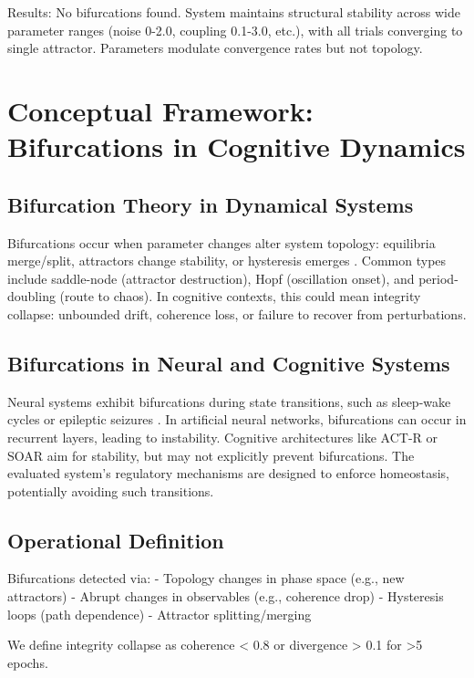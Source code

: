 \documentclass[11pt,a4paper]{article}
\begin{document}
Results: No bifurcations found. System maintains structural stability across wide parameter ranges (noise 0-2.0, coupling 0.1-3.0, etc.), with all trials converging to single attractor. Parameters modulate convergence rates but not topology.

\section{Conceptual Framework: Bifurcations in Cognitive Dynamics}

\subsection{Bifurcation Theory in Dynamical Systems}

Bifurcations occur when parameter changes alter system topology: equilibria merge/split, attractors change stability, or hysteresis emerges \cite{Ott2002}. Common types include saddle-node (attractor destruction), Hopf (oscillation onset), and period-doubling (route to chaos). In cognitive contexts, this could mean integrity collapse: unbounded drift, coherence loss, or failure to recover from perturbations.

\subsection{Bifurcations in Neural and Cognitive Systems}

Neural systems exhibit bifurcations during state transitions, such as sleep-wake cycles or epileptic seizures \cite{Strogatz2018}. In artificial neural networks, bifurcations can occur in recurrent layers, leading to instability. Cognitive architectures like ACT-R or SOAR aim for stability, but may not explicitly prevent bifurcations. The evaluated system's regulatory mechanisms are designed to enforce homeostasis, potentially avoiding such transitions.

\subsection{Operational Definition}

Bifurcations detected via:
- Topology changes in phase space (e.g., new attractors)
- Abrupt changes in observables (e.g., coherence drop)
- Hysteresis loops (path dependence)
- Attractor splitting/merging

We define integrity collapse as coherence < 0.8 or divergence > 0.1 for >5 epochs.
\end{document}
